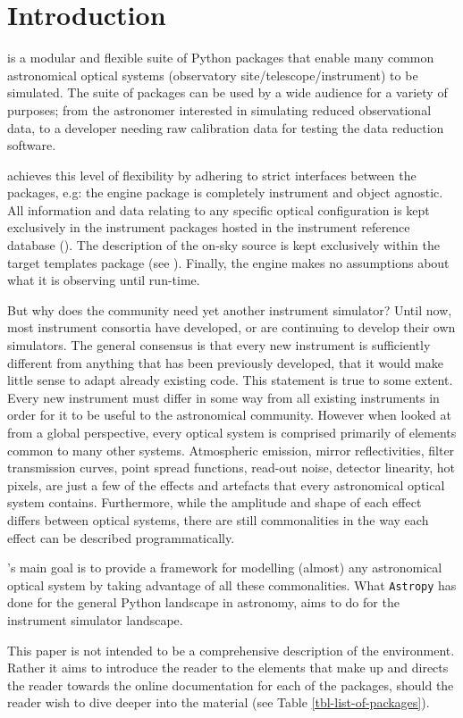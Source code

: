 \section{Introduction}
\label{introduction}

\ScopeSim{} is a modular and flexible suite of Python packages that enable many common astronomical optical systems (observatory site/telescope/instrument) to be simulated.
The suite of packages can be used by a wide audience for a variety of purposes; from the astronomer interested in simulating reduced observational data, to a developer needing raw calibration data for testing the data reduction software.

\ScopeSim{} achieves this level of flexibility by adhering to strict interfaces between the packages, e.g: the \ScopeSim{} engine package is completely instrument and object agnostic.
All information and data relating to any specific optical configuration is kept exclusively in the instrument packages hosted in the instrument reference database (\IRDB{}).
The description of the on-sky source is kept exclusively within the target templates package (see \ScopeSimtemplates{}).
Finally, the engine makes no assumptions about what it is observing until run-time.

But why does the community need yet another instrument simulator?
Until now, most instrument consortia have developed, or are continuing to develop their own simulators\cite{hsim, schmalzl2012, simcado2016, simcado2019}.
The general consensus is that every new instrument is sufficiently different from anything that has been previously developed, that it would make little sense to adapt already existing code.
This statement is true to some extent.
Every new instrument must differ in some way from all existing instruments in order for it to be useful to the astronomical community.
However when looked at from a global perspective, every optical system is comprised primarily of elements common to many other systems.
Atmospheric emission, mirror reflectivities, filter transmission curves, point spread functions, read-out noise, detector linearity, hot pixels, are just a few of the effects and artefacts that every astronomical optical system contains.
Furthermore, while the amplitude and shape of each effect differs between optical systems, there are still commonalities in the way each effect can be described programmatically.

\ScopeSim{}'s main goal is to provide a framework for modelling (almost) any astronomical optical system by taking advantage of all these commonalities.
What \lstinline{Astropy}\cite{astropy1, astropy2} has done for the general Python landscape in astronomy, \ScopeSim{} aims to do for the instrument simulator landscape.

This paper is not intended to be a comprehensive description of the \ScopeSim{} environment.
Rather it aims to introduce the reader to the elements that make up \ScopeSim{} and directs the reader towards the online documentation for each of the packages, should the reader wish to dive deeper into the material (see Table \ref{tbl-list-of-packages}).
